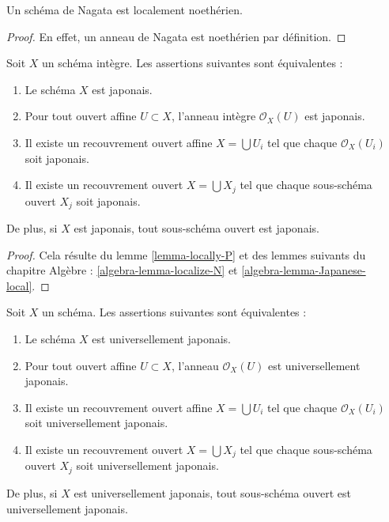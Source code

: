 \begin{lemma}
\label{lemma-nagata-locally-Noetherian}
Un schéma de Nagata est localement noethérien.
\end{lemma}

\begin{proof}
En effet, un anneau de Nagata est noethérien par définition.
\end{proof}

\begin{lemma}
\label{lemma-locally-Japanese}
Soit $X$ un schéma intègre. Les assertions suivantes sont équivalentes :
\begin{enumerate}
\item Le schéma $X$ est japonais.
\item Pour tout ouvert affine $U \subset X$, l'anneau intègre $\mathcal{O}_X(U)$
est japonais.
\item Il existe un recouvrement ouvert affine $X = \bigcup U_i$
tel que chaque $\mathcal{O}_X(U_i)$ soit japonais.
\item Il existe un recouvrement ouvert $X = \bigcup X_j$
tel que chaque sous-schéma ouvert $X_j$ soit japonais.
\end{enumerate}
De plus, si $X$ est japonais, tout sous-schéma ouvert
est japonais.
\end{lemma}

\begin{proof}
Cela résulte du lemme \ref{lemma-locally-P} et des lemmes suivants du chapitre Algèbre : \ref{algebra-lemma-localize-N} et
\ref{algebra-lemma-Japanese-local}.
\end{proof}

\begin{lemma}
\label{lemma-locally-universally-Japanese}
Soit $X$ un schéma. Les assertions suivantes sont équivalentes :
\begin{enumerate}
\item Le schéma $X$ est universellement japonais.
\item Pour tout ouvert affine $U \subset X$, l'anneau $\mathcal{O}_X(U)$
est universellement japonais.
\item Il existe un recouvrement ouvert affine $X = \bigcup U_i$
tel que chaque $\mathcal{O}_X(U_i)$ soit universellement japonais.
\item Il existe un recouvrement ouvert $X = \bigcup X_j$
tel que chaque sous-schéma ouvert $X_j$ soit universellement japonais.
\end{enumerate}
De plus, si $X$ est universellement japonais, tout sous-schéma ouvert
est universellement japonais.
\end{lemma}

